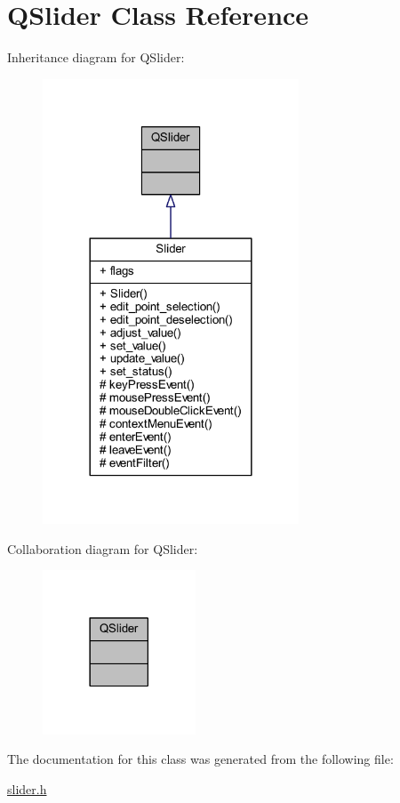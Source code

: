 \hypertarget{a00012}{\section{Q\+Slider Class Reference}
\label{a00012}
}


Inheritance diagram for Q\+Slider\+:
\nopagebreak
\begin{figure}[H]
\begin{center}
\leavevmode
\includegraphics[width=216pt]{d9/d0d/a00298}
\end{center}
\end{figure}


Collaboration diagram for Q\+Slider\+:
\nopagebreak
\begin{figure}[H]
\begin{center}
\leavevmode
\includegraphics[width=129pt]{df/d95/a00299}
\end{center}
\end{figure}


The documentation for this class was generated from the following file\+:\begin{DoxyCompactItemize}
\item 
\hyperlink{a00025}{slider.\+h}\end{DoxyCompactItemize}
